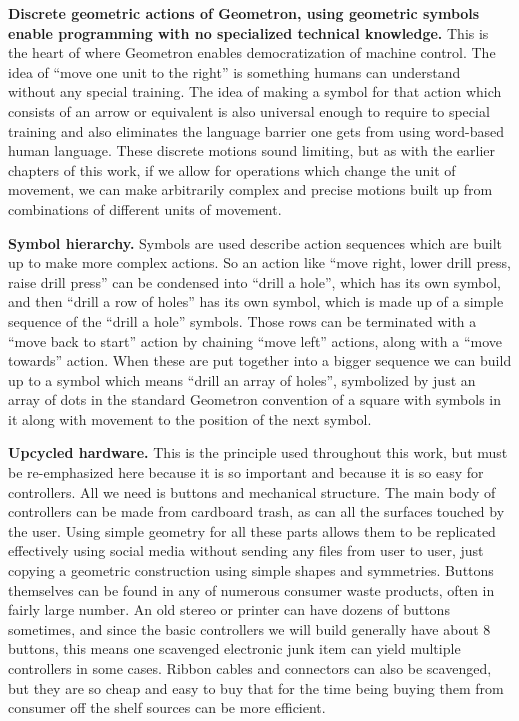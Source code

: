 \textbf{Discrete geometric actions of Geometron, using geometric symbols enable programming with no specialized technical knowledge.}  This is the heart of where Geometron enables democratization of machine control.  The idea of ``move one unit to the right'' is something humans can understand without any special training.  The idea of making a symbol for that action which consists of an arrow or equivalent is also universal enough to require to special training and also eliminates the language barrier one gets from using word-based human language. These discrete motions sound limiting, but as with the earlier chapters of this work, if we allow for operations which change the unit of movement, we can make arbitrarily complex and precise motions built up from combinations of different units of movement.  

\textbf{Symbol hierarchy.}  Symbols are used describe action sequences which are built up to make more complex actions.  So an action like ``move right, lower drill press, raise drill press'' can be condensed into ``drill a hole'', which has its own symbol, and then ``drill a row of holes'' has its own symbol, which is made up of a simple sequence of the ``drill a hole'' symbols.  Those rows can be terminated with a ``move back to start'' action by chaining ``move left'' actions, along with a ``move towards'' action.  When these are put together into a bigger sequence we can build up to a symbol which means ``drill an array of holes'', symbolized by just an array of dots in the standard Geometron convention of a square with symbols in it along with movement to the position of the next symbol.

\textbf{Upcycled hardware.}  This is the principle used throughout this work, but must be re-emphasized here because it is so important and because it is so easy for controllers.  All we need is buttons and mechanical structure.  The main body of controllers can be made from cardboard trash, as can all the surfaces touched by the user.  Using simple geometry for all these parts allows them to be replicated effectively using social media without sending any files from user to user, just copying a geometric construction using simple shapes and symmetries.  Buttons themselves can be found in any of numerous consumer waste products, often in fairly large number.  An old stereo or printer can have dozens of buttons sometimes, and since the basic controllers we will build generally have about 8 buttons, this means one scavenged electronic junk item can yield multiple controllers in some cases.  Ribbon cables and connectors can also be scavenged, but they are so cheap and easy to buy that for the time being buying them from consumer off the shelf sources can be more efficient.


